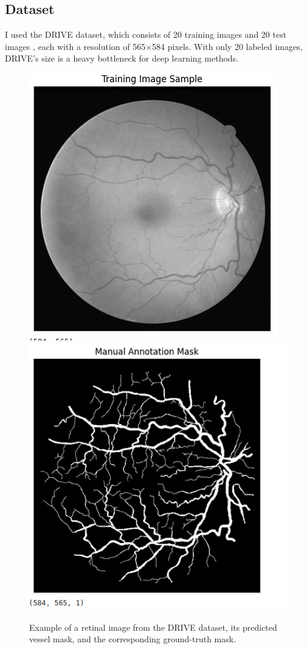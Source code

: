 \documentclass[11pt]{article}
\begin{document}
\subsection{Dataset}
\label{sec:Dataset}

I used the DRIVE dataset, which consists of 20 training images and 20 test images \cite{drivedataset}, each with a resolution of 565×584 pixels. With only 20 labeled images, DRIVE’s size is a heavy bottleneck for deep learning methods.

\begin{figure}[h!]
    \centering
    \includegraphics[scale=0.5]{figure_dataset_example.png}
    \includegraphics[scale=0.5]{annot_example.png}
    \caption{Example of a retinal image from the DRIVE dataset, its predicted vessel mask, and the corresponding ground-truth mask.}
    \label{fig:dataset_example}
\end{figure}
\end{document}
